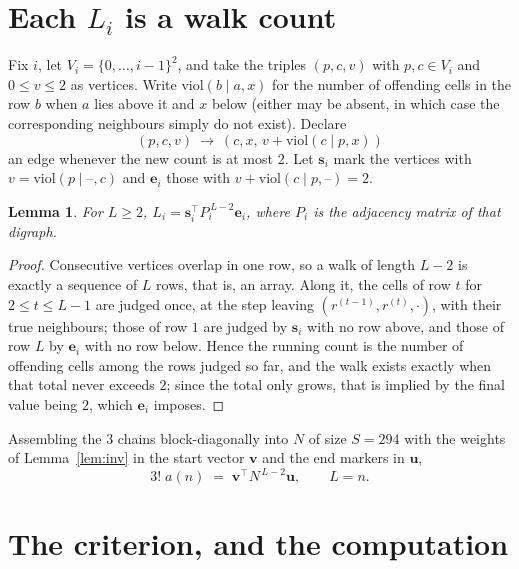 \documentclass[11pt,a4paper]{article}
\theoremstyle{plain}
\newtheorem{lemma}[theorem]{Lemma}
\theoremstyle{definition}
\begin{document}
\section{Each $L_i$ is a walk count}

Fix $i$, let $V_i=\{0,\dots,i-1\}^{2}$, and take the triples $(p,c,v)$ with
$p,c\in V_i$ and $0\le v\le2$ as vertices. Write $\mathrm{viol}(b\mid a,x)$ for the number
of offending cells in the row $b$ when $a$ lies above it and $x$ below (either may be
absent, in which case the corresponding neighbours simply do not exist). Declare
\[
(p,c,v)\ \longrightarrow\ (c,x,\,v+\mathrm{viol}(c\mid p,x))
\]
an edge whenever the new count is at most $2$. Let $\mathbf{s}_i$ mark the vertices with
$v=\mathrm{viol}(p\mid\text{--},c)$ and $\mathbf{e}_i$ those with
$v+\mathrm{viol}(c\mid p,\text{--})=2$.

\begin{lemma}\label{lem:walk}
For $L\ge2$, $L_i=\mathbf{s}_i^{\!\top}P_i^{\,L-2}\mathbf{e}_i$, where $P_i$ is the
adjacency matrix of that digraph.
\end{lemma}

\begin{proof}
Consecutive vertices overlap in one row, so a walk of length $L-2$ is exactly a sequence
of $L$ rows, that is, an array. Along it, the cells of row $t$ for $2\le t\le L-1$ are
judged once, at the step leaving $(r^{(t-1)},r^{(t)},\cdot)$, with their true neighbours;
those of row $1$ are judged by $\mathbf{s}_i$ with no row above, and those of row
$L$ by $\mathbf{e}_i$ with no row below. Hence the running count is the number of
offending cells among the rows judged so far, and the walk exists exactly when that total
never exceeds $2$; since the total only grows, that is implied by the final value being
$2$, which $\mathbf{e}_i$ imposes.
\end{proof}

Assembling the $3$ chains block-diagonally into $N$ of size $S=294$ with the weights of
Lemma~\ref{lem:inv} in the start vector $\mathbf{v}$ and the end markers in
$\mathbf{u}$,
\begin{equation}\label{eq:walk2}
3!\;a(n)\;=\;\mathbf{v}^{\!\top}N^{\,L-2}\mathbf{u},\qquad L=n .
\end{equation}

\section{The criterion, and the computation}
\end{document}
